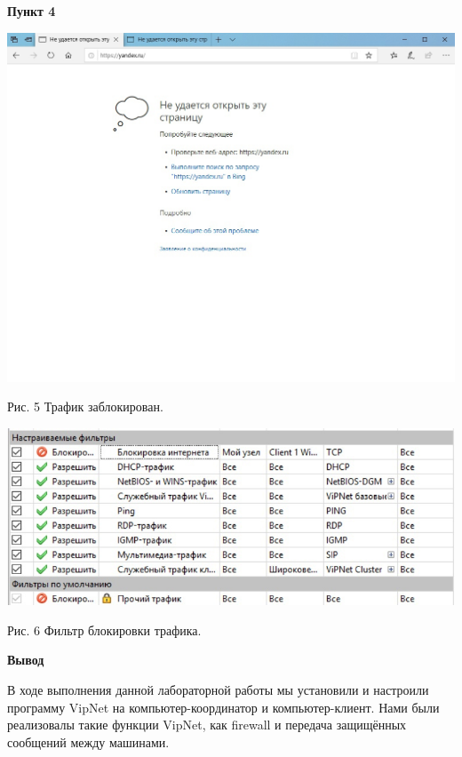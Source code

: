 \documentclass[a4paper,14pt]{extarticle}
\begin{document}
    \newpage
    \textbf{Пункт 4}
    \vspace{-3ex}
    \begin{center}
        \singlespacing

        \includegraphics[scale=0.45]{pics/4_1.jpg}

        Рис. 5 Трафик заблокирован.

        \includegraphics[scale=0.55]{pics/4_2.jpg}

        Рис. 6 Фильтр блокировки трафика.
    \end{center}

   \textbf{Вывод}\par
   В ходе выполнения данной лабораторной работы мы установили и настроили 
   программу VipNet на компьютер-координатор и компьютер-клиент. Нами были \linebreak 
   реализовалы такие функции VipNet, как firewall и передача защищённых сообщений 
   между машинами.
\end{document}
